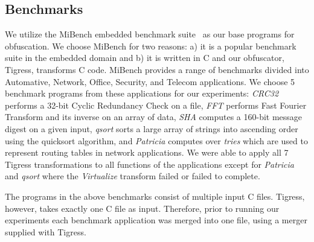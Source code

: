 \subsection{Benchmarks}
We utilize the MiBench embedded benchmark suite~\cite{guthaus2001mibench} as our base programs for obfuscation. We choose MiBench for two reasons: a) it is a popular benchmark suite in the embedded domain and b) it is written in C and our obfuscator, Tigress, transforms C code. MiBench provides a range of benchmarks divided into Automative, Network, Office, Security, and Telecom applications. We choose 5 benchmark programs from these applications for our experiments: \textit{CRC32} performs a 32-bit Cyclic Redundancy Check on a file, \textit{FFT} performs Fast Fourier Transform and its inverse on an array of data, \textit{SHA} computes a 160-bit message digest on a given input, \textit{qsort} sorts a large array of strings into ascending order using the quicksort algorithm, and \textit{Patricia} computes over {\em tries} which are used to represent routing tables in network applications.
We were able to apply all 7 Tigress transformations to all functions of the applications except for \textit{Patricia} and \textit{qsort} where the \textit{Virtualize} transform failed or failed to complete.

The programs in the above benchmarks consist of multiple input C files. Tigress, however, takes  exactly one C file as input. Therefore, prior to running our experiments each benchmark application was merged into one file, using a merger supplied with Tigress.

